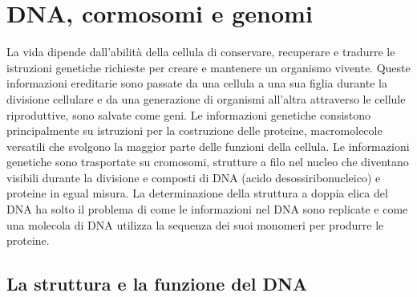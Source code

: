 \chapter{DNA, cormosomi e genomi}
La vida dipende dall'abilit\`a della cellula di conservare, recuperare e tradurre le istruzioni genetiche richieste per creare e mantenere un organismo vivente. Queste informazioni
ereditarie sono passate da una cellula a una sua figlia durante la divisione cellulare e da una generazione di organismi all'altra attraverso le cellule riproduttive, sono salvate come
geni. Le informazioni genetiche consistono principalmente su istruzioni per la costruzione delle proteine, macromolecole versatili che svolgono la maggior parte delle funzioni della 
cellula. Le informazioni genetiche sono trasportate su cromosomi, strutture a filo nel nucleo che diventano visibili durante la divisione e composti di DNA (acido desossiribonucleico) e 
proteine in egual misura. La determinazione della struttura a doppia elica del DNA ha solto il problema di come le informazioni nel DNA sono replicate e come una molecola di DNA utilizza
la sequenza dei suoi monomeri per produrre le proteine. 
\section{La struttura e la funzione del DNA}
